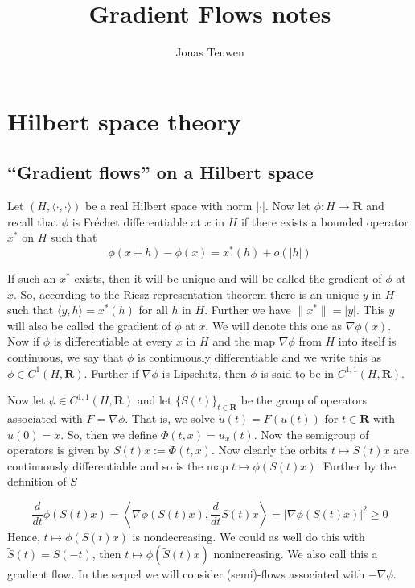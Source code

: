 \documentclass[a4paper,11pt, leqno]{scrreprt} %
\author{Jonas Teuwen}
\title{Gradient Flows notes}
\renewcommand{\geq}{\geqslant}
\newcommand{\R}{\mathbf R}
\theoremstyle{change}
\theoremstyle{nonumberplain}
\begin{document}
\maketitle
\tableofcontents
\chapter{Hilbert space theory}

\section{``Gradient flows'' on a Hilbert space}
Let $(H, \langle \cdot, \cdot \rangle)$ be a real Hilbert space with norm $| \cdot |$. Now let $\phi:H \to \R$ and recall that $\phi$ is Fr\'echet differentiable at $x$ in $H$ if there exists a bounded operator $x^*$ on $H$ such that 
\[
\phi(x + h) - \phi(x) = x^*(h) + o(|h|)
\]

If such an $x^*$ exists, then it will be unique and will be called the gradient of $\phi$ at $x$. So, according to the Riesz representation theorem there is an unique $y$ in $H$ such that $\langle y, h \rangle = x^*(h)$ for all $h$ in $H$. Further we have $\|x^*\| = |y|$. This $y$ will also be called the gradient of $\phi$ at $x$. We will denote this one as $\nabla \phi(x)$. Now if $\phi$ is differentiable at every $x$ in $H$ and the map $\nabla \phi$ from $H$ into itself is continuous, we say that $\phi$ is continuously differentiable and we write this as $\phi \in C^1(H,\R)$. Further if $\nabla \phi$ is Lipschitz, then $\phi$ is said to be in $C^{1,1}(H,\R)$.

Now let $\phi \in C^{1,1}(H,\R)$ and let $\{S(t)\}_{t \in \R}$ be the group of operators associated with $F = \nabla \phi$. That is, we solve $\dot{u}(t) = F(u(t))$ for $t \in \R$ with $u(0) = x$. So, then we define $\Phi(t,x) = u_x(t)$. Now the semigroup of operators is given by $S(t)x := \Phi(t,x)$. Now clearly the orbits $t \mapsto S(t)x$ are continuously differentiable and so is the map $t \mapsto \phi(S(t)x)$. Further by the definition of $S$

\[
\frac{d}{dt} \phi(S(t)x) = \left \langle \nabla \phi(S(t)x), \frac{d}{dt} S(t)x \right \rangle = |\nabla \phi(S(t)x)|^2 \geq 0
\]
Hence, $t \mapsto \phi(S(t)x)$ is nondecreasing. We could as well do this with $\tilde{S}(t) = S(-t)$, then $t \mapsto \phi(\tilde{S}(t)x)$ nonincreasing. We also call this a gradient flow. In the sequel we will consider (semi)-flows associated with  $-\nabla \phi$.
\end{document}
